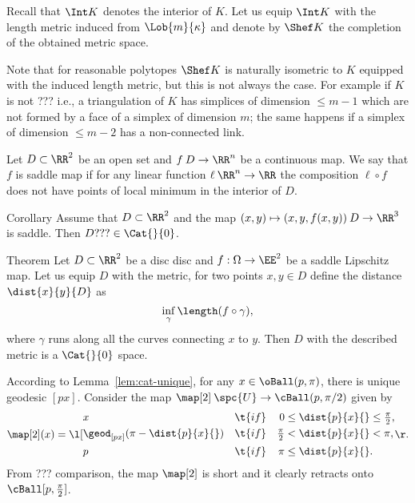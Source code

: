 Recall that $\Int K$ denotes the interior of $K$.
Let us equip $\Int K$ with the length metric induced from $\Lob{m}{\kappa}$
and denote by $\Shef K$ the completion of the obtained metric space.

Note that for reasonable polytopes $\Shef K$ is naturally isometric to $K$ equipped with the induced length metric,
but this is not always the case.
For example if $K$ is not ??? i.e., a triangulation of $K$ has simplices of dimension $\le m-1$ which are not formed by a face of a simplex of dimension $m$;
the same happens if a simplex of dimension $\le m-2$ has a non-connected link.














Let $D\subset\RR^2$ be an open set
and $f\:D\to\RR^n$ be a continuous map.
We say that $f$ is saddle map if for any linear function $\ell\:\RR^n\to\RR$ the composition $\ell\circ f$ does not have points of local 
minimum in the interior of $D$.


\begin{thm}{Corollary}
Assume that $D\subset \RR^2$ and the map 
$(x,y)\mapsto (x,y,f(x,y))\:D\to\RR^3$ is saddle.
Then $D???\in\Cat{}{0}$.
\end{thm}


\begin{thm}{Theorem}
Let $D\subset\RR^2$ be a disc
disc and $f:\Omega\to\EE^2$ be a saddle Lipschitz map.
Let us equip $D$ with the metric,
for two points $x,y\in D$ define the distance 
$\dist{x}{y}{D}$ as 
$$\inf_{\gamma}\length(f\circ\gamma),$$
where 
$\gamma$ runs along all the curves connecting $x$ to $y$.
Then $D$ with the described metric is a $\Cat{}{0}$ space.
\end{thm}












According to Lemma~\ref{lem:cat-unique}, 
for any $x\in\oBall(p,\pi)$,
there is unique geodesic $[px]$.
Consider the map $\map[2]\:\spc{U}\to\cBall(p,\pi/2)$ given by
\[
\map[2](x)
=
\l[
\begin{aligned}
&x
&&\t{if}
&0&\le\dist{p}{x}{}\le\tfrac{\pi}{2},
\\
&\geod_{[px]}(\pi-\dist{p}{x}{})
&&\t{if}
& \tfrac{\pi}{2}&<\dist{p}{x}{}<\pi,
\\
&p
&&\t{if}
& \pi&\le \dist{p}{x}{}.
\end{aligned}
\r.
\]
From ??? comparison, the map $\map[2]$ is short and it clearly retracts onto $\cBall[p,\tfrac{\pi}{2}]$.

